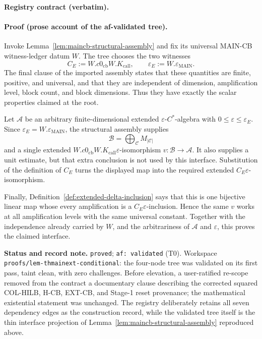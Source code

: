 \noindent\textbf{Registry contract (verbatim).}

\paragraph{Proof (prose account of the af-validated tree).}
Invoke Lemma~\ref{lem:maincb-structural-assembly} and fix its universal MAIN-CB
witness-ledger datum $W$.  The tree chooses the two witnesses
\[
  C_{E}:=W.c0_{\mathrm{cb}}W.K_{\mathrm{call}},
  \qquad
  \varepsilon_{E}:=W.\varepsilon_{\mathrm{MAIN}}.
\]
The final clause of the imported assembly states that these quantities are
finite, positive, and universal, and that they are independent of dimension,
amplification level, block count, and block dimensions.  Thus they have exactly
the scalar properties claimed at the root.

Let $\mathcal A$ be an arbitrary finite-dimensional extended
$\varepsilon$-$C^{*}$-algebra with
$0\le\varepsilon\le\varepsilon_{E}$.  Since
$\varepsilon_{E}=W.\varepsilon_{\mathrm{MAIN}}$, the structural assembly
supplies
\[
  \mathcal B=\bigoplus_{\mathcal C}M_{|\mathcal C|}
\]
and a single extended
$W.c0_{\mathrm{cb}}W.K_{\mathrm{call}}\varepsilon$-isomorphism
$v:\mathcal B\to\mathcal A$.  It also supplies a unit estimate, but that extra
conclusion is not used by this interface.  Substitution of the definition of
$C_{E}$ turns the displayed map into the required extended
$C_{E}\varepsilon$-isomorphism.

Finally, Definition~\ref{def:extended-delta-inclusion} says that this is one
bijective linear map whose every amplification is a
$C_{E}\varepsilon$-inclusion.  Hence the same $v$ works at all amplification
levels with the same universal constant.  Together with the independence
already carried by $W$, and the arbitrariness of $\mathcal A$ and
$\varepsilon$, this proves the claimed interface.

\medskip
\noindent\textbf{Status and record note.} \texttt{proved};
\texttt{af: validated} (T0).  Workspace
\texttt{proofs/lem-thmainext-conditional}: the four-node tree was validated on
its first pass, taint clean, with zero challenges.  Before elevation, a
user-ratified re-scope removed from the contract a documentary clause describing
the corrected squared COL-HILB, H-CB, EXT-CB, and Stage-1 reset provenance; the
mathematical existential statement was unchanged.  The registry deliberately
retains all seven dependency edges as the construction record, while the
validated tree itself is the thin interface projection of
Lemma~\ref{lem:maincb-structural-assembly} reproduced above.
